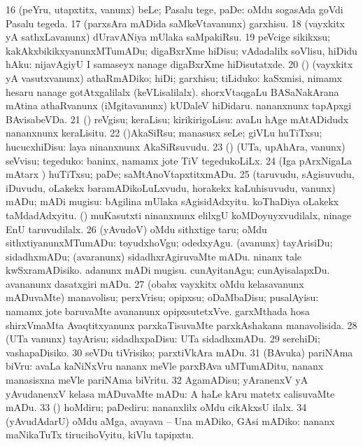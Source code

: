 {{\num{16} (peYru, utapxtitx, \mo vanunx) beLe; Pasalu tege, paDe:  oMdu sogasAda goVdi Pasalu tegeda. 
\num{17} (parxsAra mADida saMkeVtavanunx) garxhisu. 
\num{18} (vayxkitx yA sathxLavanunx) dUravANiya mUlaka saMpakiRsu. 
\num{19} peVcige sikikxsu; kakAkxbikikxyanunxMTumADu; digaBxrXme hiDisu; vAdadalilx soVlisu, hiDidu hAku:  nijavAgiyU I samaseyx nanage digaBxrXme hiDisutatxde. 
\num{20} (\AmA) (vayxkitx yA vasutxvanunx) athaRmADiko; hiDi;
garxhisu; tiLiduko:  kaSxmisi, nimamx hesaru nanage gotAtxgalilalx (keVLisalilalx).  shorxVtaqgaLu BASaNakArana mAtina athaRvanunx (iMgitavanunx)
kUDaleV hiDidaru.  nananxnunx tapApxgi BAvisabeVDa. 
\num{21} (\AmA) reVgisu; keraLisu; kirikirigoLisu:  avaLu hAge mAtADidudx nananxnunx keraLisitu. 
\num{22} (\AmA)AkaSiRsu; manasusx seLe; giVLu huTiTxsu; hucucxhiDisu:  laya ninanxnunx AkaSiRsuvudu. 
\num{23} (\AmA) (UTa, upAhAra, \mo vanunx) seVvisu; tegeduko:  baninx, namamx jote TiV tegedukoLiLx. 
\num{24} (Iga pArxNigaLa \vi mAtarx ) huTiTxsu; paDe; saMtAnoVtapxtitxmADu. 
\num{25} (taruvudu, sAgisuvudu, iDuvudu, oLakekx baramADikoLuLxvudu, horakekx kaLuhisuvudu, \mo vanunx) mADu; mADi mugisu:  bAgilina mUlaka sAgisidAdxyitu.  koThaDiya oLakekx taMdadAdxyitu. (\rUpa)  muKasutxti ninanxnunx elilxgU koMDoyuyxvudilalx, ninage EnU taruvudilalx. 
\num{26} (yAvudoV) oMdu sithxtige taru; oMdu sithxtiyanunxMTumADu:
 toyudxhoVgu; odedxyAgu.  (avanunx)
tayArisiDu; sidadhxmADu; (avaranunx) sidadhxrAgiruvaMte mADu.  ninanx tale kwSxramADisiko.  adanunx
mADi mugisu.  cunAyitanAgu;
cunAyisalapxDu.  avananunx dasatxgiri mADu. 
\num{27} (obabx vayxkitx oMdu kelasavanunx mADuvaMte) manavolisu;
perxVrisu; opipxsu; oDaMbaDisu; pusalAyisu:  namamx jote baruvaMte avananunx opipxsutetxVve.  garxMthada hosa shirxVmaMta Avaqtitxyanunx parxkaTisuvaMte parxkAshakana manavolisida. 
\num{28} (UTa \mo vanunx) tayArisu; sidadhxpaDisu:  UTa sidadhxmADu. 
\num{29} serehiDi; vashapaDisiko. 
\num{30} seVDu tiVrisiko; parxtiVkAra mADu. 
\num{31} (BAvuka) pariNAma biVru:  avaLa kaNiNxVru nananx meVle
parxBAva uMTumADitu, nananx manasisxna meVle pariNAma biVritu. 
\num{32} AgamADisu; yAranenxV yA yAvudanenxV kelasa mADuvaMte mADu:  A haLe kAru matetx calisuvaMte mADu. 
\num{33} (\AmA) hoMdiru; paDediru:  nananxlilx oMdu cikAkxsU ilalx. 
\num{34} (yAvudAdarU) oMdu aMga, avayava -- Una mADiko, GAsi mADiko:  nananx maNikaTuTx tirucihoVyitu, kiVlu tapipxtu.}}

